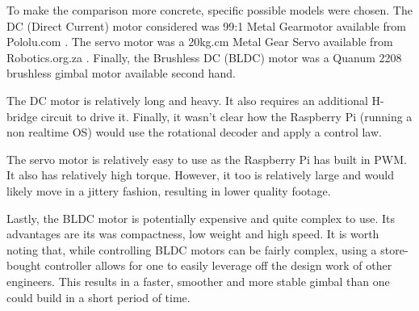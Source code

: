 

To make the comparison more concrete, specific possible models were chosen. The DC (Direct Current) motor considered was 99:1 Metal Gearmotor available from Pololu.com \cite{DC_motor_choice}. The servo motor was a 20kg.cm Metal Gear Servo available from Robotics.org.za \cite{servo_motor_choice}. Finally, the Brushless DC (BLDC) motor was a Quanum 2208 brushless gimbal motor \cite{bldc_motor_choice} available second hand.

The DC motor is relatively long and heavy. It also requires an additional H-bridge circuit to drive it. Finally, it wasn't clear how the Raspberry Pi (running a non realtime OS) would use the rotational decoder and apply a control law.

The servo motor is relatively easy to use as the Raspberry Pi has built in PWM. It also has relatively high torque. However, it too is relatively large and would likely move in a jittery fashion, resulting in lower quality footage.

Lastly, the BLDC motor is potentially expensive and quite complex to use. Its advantages are its was compactness, low weight and high speed. It is worth noting that, while controlling BLDC motors can be fairly complex, using a store-bought controller allows for one to easily leverage off the design work of other engineers. This results in a faster, smoother and more stable gimbal than one could build in a short period of time.

